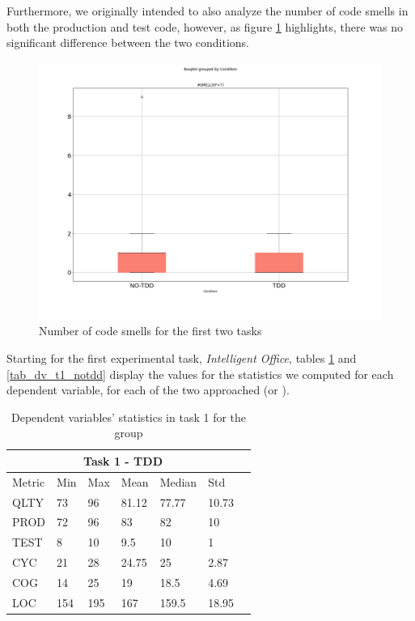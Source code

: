 Furthermore, we originally intended to also analyze the number of code smells in both the production and test code, however, as figure \ref{bp_task1_2_smells} highlights, there was no significant difference between the two conditions.

\begin{figure}[h]
    \centering
    \includegraphics[width=\linewidth]{figures/box_plots/SMELLS.png}
    \caption{Number of code smells for the first two tasks}
    \label{bp_task1_2_smells}
\end{figure}





\noindent Starting for the first experimental task, \textit{Intelligent Office}, tables \ref{tab_dv_t1_tdd} and \ref{tab_dv_t1_notdd} display the values for the statistics we computed for each dependent variable, for each of the two approached (\ie \tdd or \notdd).

\begin{table}[!h]
    \begin{center} 
        \begin{tabular}{|p{1.8cm}||p{1.6cm}|p{1.6cm}|p{1.6cm}|p{1.6cm}|p{1.6cm}|p{1.6cm}|}
            \hline
                \multicolumn{6}{|c|}{Task 1 - TDD} \\
            \hline
                Metric & Min & Max & Mean & Median & Std \\
            \hline
                QLTY & 73 & 96 & 81.12 & 77.77 & 10.73 \\
                PROD & 72 & 96 & 83 & 82 & 10 \\
                TEST & 8 & 10 & 9.5 & 10 & 1 \\
                CYC & 21 & 28 & 24.75 & 25 & 2.87 \\
                COG & 14 & 25 & 19 & 18.5 & 4.69 \\
                LOC & 154 & 195 & 167 & 159.5 & 18.95 \\
            \hline
        \end{tabular}
        \caption{\label{tab_dv_t1_tdd}Dependent variables' statistics in task 1 for the \tdd group}
    \end{center}
\end{table}

